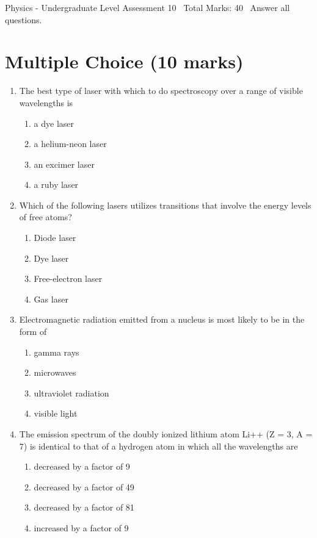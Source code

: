 \documentclass[12pt]{article}
\begin{document}
\begin{center}
Physics - Undergraduate Level Assessment 10 \
Total Marks: 40 \
Answer all questions.
\end{center}

\section*{Multiple Choice (10 marks)}
\begin{enumerate}[label=\arabic*.]
\item The best type of laser with which to do spectroscopy over a range of visible wavelengths is
\begin{enumerate}[label=(\alph*)]
    \item a dye laser
    \item a helium-neon laser
    \item an excimer laser
    \item a ruby laser
\end{enumerate}
\item Which of the following lasers utilizes transitions that involve the energy levels of free atoms?
\begin{enumerate}[label=(\alph*)]
    \item Diode laser
    \item Dye laser
    \item Free-electron laser
    \item Gas laser
\end{enumerate}
\item Electromagnetic radiation emitted from a nucleus is most likely to be in the form of
\begin{enumerate}[label=(\alph*)]
    \item gamma rays
    \item microwaves
    \item ultraviolet radiation
    \item visible light
\end{enumerate}
\item The emission spectrum of the doubly ionized lithium atom Li++ (Z = 3, A = 7) is identical to that of a hydrogen atom in which all the wavelengths are
\begin{enumerate}[label=(\alph*)]
    \item decreased by a factor of 9
    \item decreased by a factor of 49
    \item decreased by a factor of 81
    \item increased by a factor of 9

\end{enumerate}
\end{enumerate}
\end{document}
